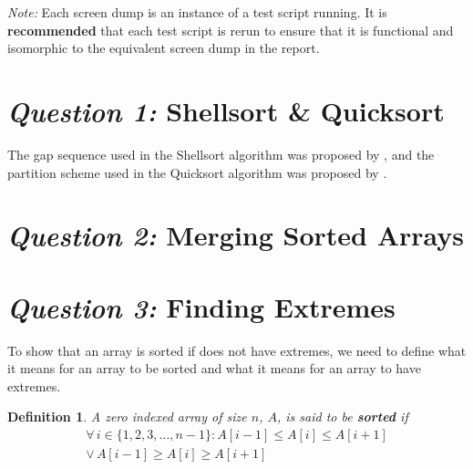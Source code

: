 \documentclass[12pt]{article}
\newtheorem*{definition}{Definition}
\begin{document}
\textit{Note:} Each screen dump is an instance of a test script
running. It is \textbf{recommended} that each test script is
rerun to ensure that it is functional and isomorphic to the
equivalent screen dump in the report.

\section{\textit{Question 1:} Shellsort \& Quicksort}

The gap sequence used in the Shellsort algorithm was proposed by
\textcite{frank60}, and the partition scheme used in the
Quicksort algorithm was proposed by \textcite{hoare62}.







\section{\textit{Question 2:} Merging Sorted Arrays}







\section{\textit{Question 3:} Finding Extremes}

To show that an array is sorted if does not have extremes, we
need to define what it means for an array to be sorted and what
it means for an array to have extremes.

\begin{definition}
  A zero indexed array of size $n$, $A$, is said to be
  \textbf{sorted} if
  \begin{align*}
    \forall \, i \in \{1,2,3,\ldots,n-1\} :
    A[i-1] \leq A[i] \leq A[i+1] \\
    \vee \,
    A[i-1] \geq A[i] \geq A[i+1]
  \end{align*}
\end{definition}
\end{document}
